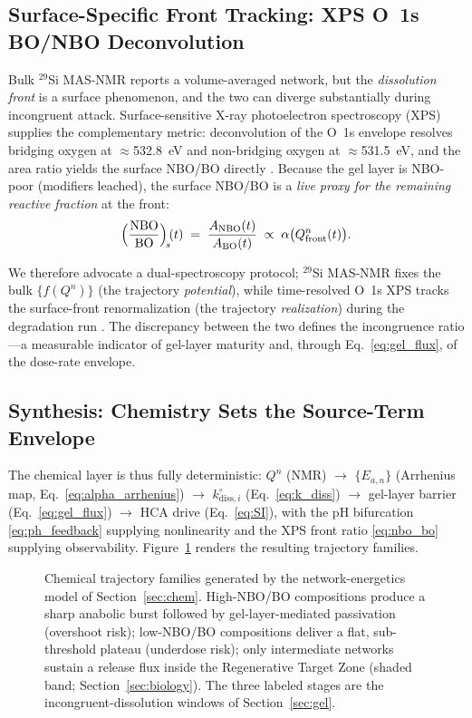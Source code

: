 \documentclass[11pt]{article}
\begin{document}
\subsection{Surface-Specific Front Tracking: XPS O~1s BO/NBO Deconvolution}
\label{sec:xps}


Bulk $^{29}$Si MAS-NMR reports a volume-averaged network, but the \emph{dissolution front} is a surface phenomenon, and the two can diverge substantially during incongruent attack. Surface-sensitive X-ray photoelectron spectroscopy (XPS) supplies the complementary metric: deconvolution of the O~1s envelope resolves bridging oxygen at $\approx$532.8~eV and non-bridging oxygen at $\approx$531.5~eV, and the area ratio yields the surface NBO/BO directly \cite{Workie2026a,Rehman2018}. Because the gel layer is NBO-poor (modifiers leached), the surface NBO/BO is a \emph{live proxy for the remaining reactive fraction} at the front:
\begin{equation}
\Bigl(\frac{\mathrm{NBO}}{\mathrm{BO}}\Bigr)_{\!s}\!(t) \;=\; \frac{A_{\mathrm{NBO}}(t)}{A_{\mathrm{BO}}(t)} \;\propto\; \alpha\bigl(Q^n_{\mathrm{front}}(t)\bigr).
\label{eq:nbo_bo}
\end{equation}


We therefore advocate a dual-spectroscopy protocol; $^{29}$Si MAS-NMR fixes the bulk $\{f(Q^n)\}$ (the trajectory \emph{potential}), while time-resolved O~1s XPS tracks the surface-front renormalization (the trajectory \emph{realization}) during the degradation run \cite{Workie2026a}. The discrepancy between the two defines the incongruence ratio---a measurable indicator of gel-layer maturity and, through Eq.~\eqref{eq:gel_flux}, of the dose-rate envelope.


\subsection{Synthesis: Chemistry Sets the Source-Term Envelope}


The chemical layer is thus fully deterministic: $Q^n$ (NMR) $\rightarrow$ $\{E_{a,n}\}$ (Arrhenius map, Eq.~\eqref{eq:alpha_arrhenius}) $\rightarrow$ $k_{\mathrm{diss},i}^{\circ}$ (Eq.~\eqref{eq:k_diss}) $\rightarrow$ gel-layer barrier (Eq.~\eqref{eq:gel_flux}) $\rightarrow$ HCA drive (Eq.~\eqref{eq:SI}), with the pH bifurcation \eqref{eq:ph_feedback} supplying nonlinearity and the XPS front ratio \eqref{eq:nbo_bo} supplying observability. Figure~\ref{fig:chem} renders the resulting trajectory families.


\begin{figure}[htbp]
\centering

\caption{Chemical trajectory families generated by the network-energetics model of Section~\ref{sec:chem}. High-NBO/BO compositions produce a sharp anabolic burst followed by gel-layer-mediated passivation (overshoot risk); low-NBO/BO compositions deliver a flat, sub-threshold plateau (underdose risk); only intermediate networks sustain a release flux inside the Regenerative Target Zone (shaded band; Section~\ref{sec:biology}). The three labeled stages are the incongruent-dissolution windows of Section~\ref{sec:gel}.}
\label{fig:chem}
\end{figure}
\end{document}
